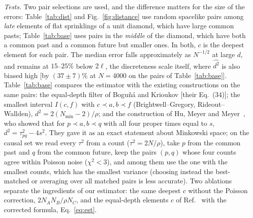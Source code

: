 \documentclass[prd,twocolumn,superscriptaddress,nofootinbib,amsmath,amssymb,floatfix]{revtex4-2}
\begin{document}
\emph{Tests.} Two pair selections are used, and the difference matters for the size of the errors: Table~\ref{tab:dist} and Fig.~\ref{fig:distance} use random spacelike pairs among \emph{late} elements of flat sprinklings of a unit diamond, which have large common pasts; Table~\ref{tab:base} uses pairs in the \emph{middle} of the diamond, which have both a common past and a common future but smaller ones. In both, $c$ is the deepest element for each pair. The median error falls approximately as $N^{-1/2}$ at large $d$, and remains at $15$--$25\%$ below $2\ell$, the discreteness scale itself, where $\widehat{d^2}$ is also biased high [by $(37\pm7)\%$ at $N=4000$ on the pairs of Table~\ref{tab:base}]. Table~\ref{tab:base} compares the estimator with the existing constructions on the same pairs: the equal-depth filter of Bogu\~n\'a and Krioukov [their Eq.~(34)]; the smallest interval $I(c,f)$ with $c\prec a,b\prec f$ (Brightwell--Gregory, Rideout--Wallden), $d^2=2(N_{\min}-2)/\rho$; and the construction of Hu, Meyer and Meyer~\cite{HMM25}, who showed that for $p\prec a,b\prec q$ with all four proper times equal to $s$, $d^2=\tau_{pq}^2-4s^2$. They gave it as an exact statement about Minkowski space; on the causal set we read every $\tau^2$ from a count ($\tau^2=2N/\rho$), take $p$ from the common past and $q$ from the common future, keep the pairs $(p,q)$ whose four counts agree within Poisson noise ($\chi^2<3$), and among them use the one with the smallest counts, which has the smallest variance (choosing instead the best-matched or averaging over all matched pairs is less accurate). Two ablations separate the ingredients of our estimator: the same deepest $c$ without the Poisson correction, $2N_AN_B/\rho N_C$, and the equal-depth elements $c$ of Ref.~\cite{BK24} with the corrected formula, Eq.~\eqref{eq:est}.
\end{document}
